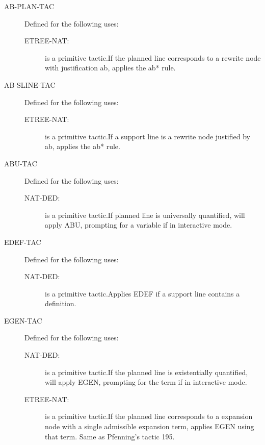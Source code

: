 \begin{description} 
\item[AB-PLAN-TAC]  Defined for the following uses:
\begin{description}
\item[ETREE-NAT:]  is a primitive tactic.If the planned line corresponds to a rewrite node with justification
ab, applies the ab* rule.

\end{description}

\item[AB-SLINE-TAC]  Defined for the following uses:
\begin{description}
\item[ETREE-NAT:]  is a primitive tactic.If a support line is a rewrite node justified by ab, applies the
ab* rule.

\end{description}

\item[ABU-TAC]  Defined for the following uses:
\begin{description}
\item[NAT-DED:]  is a primitive tactic.If planned line is universally quantified, will apply ABU, prompting
for a variable if in interactive mode.

\end{description}

\item[EDEF-TAC]  Defined for the following uses:
\begin{description}
\item[NAT-DED:]  is a primitive tactic.Applies EDEF if a support line contains a definition.

\end{description}

\item[EGEN-TAC]  Defined for the following uses:
\begin{description}
\item[NAT-DED:]  is a primitive tactic.If the planned line is existentially quantified, will apply EGEN,
prompting for the term if in interactive mode.

\item[ETREE-NAT:]  is a primitive tactic.If the planned line corresponds to a expansion node with a single
admissible expansion term, applies EGEN using that term.  Same as Pfenning's
tactic 195.


\end{description}
\end{description}
